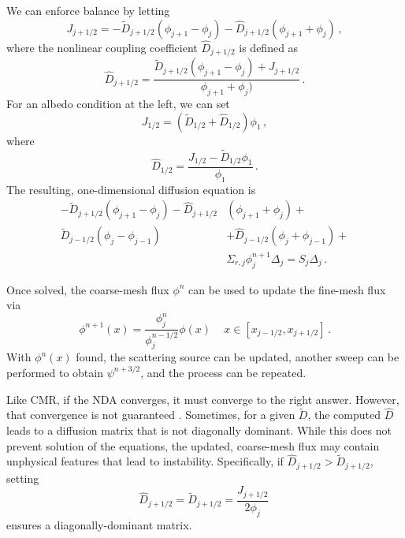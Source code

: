We can enforce balance by letting
\begin{equation}
 J_{j+1/2} = -\tilde{D}_{j+1/2} (\phi_{j+1}-\phi_j) - \hat{D}_{j+1/2}(\phi_{j+1}+\phi_j) \, ,
\end{equation}
where the nonlinear coupling coefficient $\hat{D}_{j+1/2}$ is 
defined as
\begin{equation}
 \hat{D}_{j+1/2} = \frac{\tilde{D}_{j+1/2} (\phi_{j+1}-\phi_j) + J_{j+1/2}}{\phi_{j+1}+\phi_j)} \, .
\end{equation}
For an albedo condition at the left, we can set 
\begin{equation}
 J_{1/2} = (\tilde{D}_{1/2}+\hat{D}_{1/2})\phi_1 \, ,
\end{equation}
where 
\begin{equation}
 \hat{D}_{1/2} = \frac{J_{1/2}-\tilde{D}_{1/2} \phi_1}{\phi_1} \, .
\end{equation}
The resulting, one-dimensional diffusion equation is
\begin{equation}
\begin{split}
 -\tilde{D}_{j+1/2}(\phi_{j+1}-\phi_j) - \hat{D}_{j+1/2} & (\phi_{j+1}+\phi_j)  + \\
 \tilde{D}_{j-1/2}(\phi_{j}-\phi_{j-1})& + \hat{D}_{j-1/2} (\phi_{j}+\phi_{j-1}) + \\
  & \Sigma_{r,j} \phi_{j}^{n+1} \Delta_j = S_j \Delta_j \, .
\end{split}
\end{equation}



Once solved, the coarse-mesh flux $\phi^n$ can be used to 
update the fine-mesh flux via 
\begin{equation}
 \phi^{n+1}(x) = \frac{\phi^{n}_{j}}{\phi^{n-1/2}_j} \phi(x) \, \quad x \in [x_{j-1/2},x_{j+1/2}] \, .
\end{equation}
With $\phi^{n}(x)$ found, the scattering source can be updated,  another 
sweep can be performed to obtain $\psi^{n+3/2}$, and the
process can be repeated. 


Like CMR, if the NDA converges, it must converge to 
the right answer.  However, that convergence is not guaranteed \cite{}.
Sometimes, for a given $\tilde{D}$, the computed $\hat{D}$ leads to 
a diffusion matrix that is not diagonally dominant.  While this does 
not prevent solution of the equations, the updated, coarse-mesh flux 
may contain unphysical features that lead to instability.  
Specifically, if $\hat{D}_{j+1/2} > \tilde{D}_{j+1/2}$, setting
\begin{equation}
 \hat{D}_{j+1/2} = \tilde{D}_{j+1/2} = \frac{J_{j+1/2}}{2\phi_j} \, 
\end{equation}
ensures a diagonally-dominant matrix.

